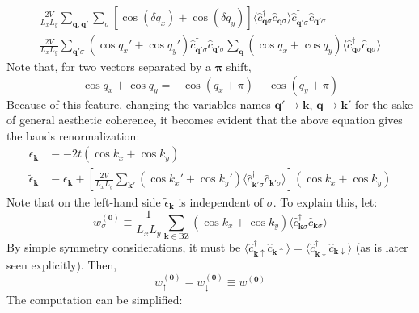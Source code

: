 \begin{multline}
	\frac{2V}{L_x L_y} \sum_{\mathbf{q}, \mathbf{q}'} \sum_\sigma \left[
		\cos \left( \delta q_x \right) + \cos \left( \delta q_y \right)	
	\right] \langle
		\hat c_{\mathbf{q}\sigma}^\dagger  \hat c_{\mathbf{q}\sigma}
	\rangle
	\hat c_{\mathbf{q}'\sigma}^\dagger  \hat c_{\mathbf{q}'\sigma} \\
	\frac{2V}{L_x L_y} \sum_{\mathbf{q}'\sigma} \left(
		\cos q_x' + \cos q_y'
	\right) \hat c_{\mathbf{q}'\sigma}^\dagger  \hat c_{\mathbf{q}'\sigma} \sum_\mathbf{q} \left(
		\cos q_x + \cos q_y
	\right) \langle
		\hat c_{\mathbf{q}\sigma}^\dagger  \hat c_{\mathbf{q}\sigma}
	\rangle
	\label{eq:reciprocal-space-non-local-interaction-fock-dd-intermediate-2}
\end{multline}
Note that, for two vectors separated by a $\bm{\pi}$ shift,
\[
	\cos q_x + \cos q_y = - \cos \left( q_x+\pi \right) - \cos \left( q_y+\pi \right)
\]
Because of this feature, changing the variables names $\mathbf{q}'\to\mathbf{k}$, $\mathbf{q}\to\mathbf{k}'$ for the sake of general aesthetic coherence, it becomes evident that the above equation gives the bands renormalization:
\[
\begin{aligned}
	\epsilon_\mathbf{k} &\equiv -2t \left(
		\cos k_x + \cos k_y
	\right) \\
	\tilde{\epsilon}_\mathbf{k} &\equiv \epsilon_\mathbf{k} + 
	\left[
		\frac{2V}{L_xL_y} \sum_{\mathbf{k}'} \left(
			\cos k_x' + \cos k_y'
		\right) \langle
		\hat c_{\mathbf{k}'\sigma}^\dagger  \hat c_{\mathbf{k}'\sigma}
		\rangle
	\right] \left(
		\cos k_x + \cos k_y
	\right)
\end{aligned}
\]
Note that on the left-hand side $\tilde{\epsilon}_\mathbf{k}$ is independent of $\sigma$. To explain this, let:
\[
	w_\sigma^{(\mathbf{0})} \equiv \frac{1}{L_xL_y} \sum_{\mathbf{k}\in\mathrm{BZ}} \left(
		\cos k_x + \cos k_y
	\right) \langle
	\hat c_{\mathbf{k}\sigma}^\dagger  \hat c_{\mathbf{k}\sigma}
	\rangle
\]
By simple symmetry considerations, it must be $\langle \hat c_{\mathbf{k}\uparrow}^\dagger  \hat c_{\mathbf{k}\uparrow} \rangle = \langle \hat c_{\mathbf{k}\downarrow}^\dagger  \hat c_{\mathbf{k}\downarrow} \rangle$ (as is later seen explicitly). Then,
\[
	w_\uparrow^{(\mathbf{0})} = w_\downarrow^{(\mathbf{0})} \equiv w^{(\mathbf{0})}
\]
The computation can be simplified:
